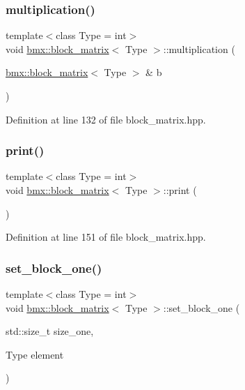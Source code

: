 \subsubsection{\texorpdfstring{multiplication()}{multiplication()}}
{\footnotesize\ttfamily template$<$class Type = int$>$ \\
void \mbox{\hyperlink{classbmx_1_1block__matrix}{bmx\+::block\+\_\+matrix}}$<$ Type $>$\+::multiplication (\begin{DoxyParamCaption}\item[{\mbox{\hyperlink{classbmx_1_1block__matrix}{bmx\+::block\+\_\+matrix}}$<$ Type $>$ \&}]{b }\end{DoxyParamCaption})\hspace{0.3cm}{\ttfamily [inline]}}



Definition at line 132 of file block\+\_\+matrix.\+hpp.

\mbox{\label{classbmx_1_1block__matrix_a6e7219a6e1c65c1ddcc1a64cdab56223}} 
\subsubsection{\texorpdfstring{print()}{print()}}
{\footnotesize\ttfamily template$<$class Type = int$>$ \\
void \mbox{\hyperlink{classbmx_1_1block__matrix}{bmx\+::block\+\_\+matrix}}$<$ Type $>$\+::print (\begin{DoxyParamCaption}{ }\end{DoxyParamCaption})\hspace{0.3cm}{\ttfamily [inline]}}



Definition at line 151 of file block\+\_\+matrix.\+hpp.

\mbox{\label{classbmx_1_1block__matrix_a3708a438e204c7479da201365e088212}} 
\subsubsection{\texorpdfstring{set\+\_\+block\+\_\+one()}{set\_block\_one()}}
{\footnotesize\ttfamily template$<$class Type = int$>$ \\
void \mbox{\hyperlink{classbmx_1_1block__matrix}{bmx\+::block\+\_\+matrix}}$<$ Type $>$\+::set\+\_\+block\+\_\+one (\begin{DoxyParamCaption}\item[{std\+::size\+\_\+t}]{size\+\_\+one,  }\item[{Type}]{element }\end{DoxyParamCaption})\hspace{0.3cm}{\ttfamily [inline]}}



